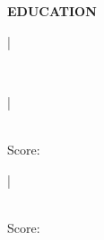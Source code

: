 %
%
%
%
%



\vspace{\spaceBeforeSection}
\textbf{EDUCATION} \hrulefill
\vspace{\spaceAfterSection}

\textbf{\PhDUniversity} | \PhDTitle \hfill \PhDDate

\begin{small}
\textit{\PhDThesisShorter} \\
\PhDNotes
\end{small}

\medskip

\textbf{\MScUniversity} | \MScTitle \hfill \MScDate

\begin{small}
\textit{\MScThesis} \\
\MScNotes Score: \MScScore %
\end{small}

\medskip

\textbf{\BScUniversity} | \BScTitle \hfill \BScDate

\begin{small}
\textit{\BScThesis} \\
\BScNotes Score: \BScScore %
\end{small}
